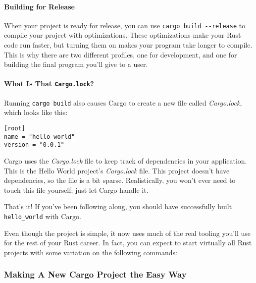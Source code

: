 \documentclass[a4paper,]{book}
\newenvironment{Shaded}{\begin{snugshade}}{\end{snugshade}}
\newcommand{\KeywordTok}[1]{\textcolor[rgb]{0.13,0.29,0.53}{\textbf{{#1}}}}
\newcommand{\NormalTok}[1]{{#1}}
\let\oldparagraph\paragraph
\renewcommand{\paragraph}[1]{\oldparagraph{#1}\mbox{}}
\begin{document}
\paragraph{Building for Release}\label{building-for-release}

When your project is ready for release, you can use
\texttt{cargo\ build\ -\/-release} to compile your project with
optimizations. These optimizations make your Rust code run faster, but
turning them on makes your program take longer to compile. This is why
there are two different profiles, one for development, and one for
building the final program you'll give to a user.

\paragraph{\texorpdfstring{What Is That
\texttt{Cargo.lock}?}{What Is That Cargo.lock?}}\label{what-is-that-cargo.lock}

Running \texttt{cargo\ build} also causes Cargo to create a new file
called \emph{Cargo.lock}, which looks like this:

\begin{verbatim}
[root]
name = "hello_world"
version = "0.0.1"
\end{verbatim}

Cargo uses the \emph{Cargo.lock} file to keep track of dependencies in
your application. This is the Hello World project's \emph{Cargo.lock}
file. This project doesn't have dependencies, so the file is a bit
sparse. Realistically, you won't ever need to touch this file yourself;
just let Cargo handle it.

That's it! If you've been following along, you should have successfully
built \texttt{hello\_world} with Cargo.

Even though the project is simple, it now uses much of the real tooling
you'll use for the rest of your Rust career. In fact, you can expect to
start virtually all Rust projects with some variation on the following
commands:

\begin{Shaded}
\end{Shaded}

\subsubsection{Making A New Cargo Project the Easy
Way}\label{making-a-new-cargo-project-the-easy-way}
\end{document}
